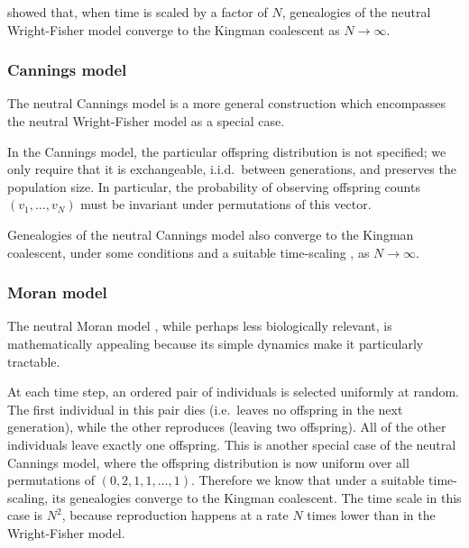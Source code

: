 \textcite{kingman1982gene} showed that, when time is scaled by a factor of $N$, genealogies of the neutral Wright-Fisher model converge to the Kingman coalescent as $N\to\infty$.

\subsubsection{Cannings model}
The neutral Cannings model \parencite{cannings1974, cannings1975} is a more general construction which encompasses the neutral Wright-Fisher model as a special case.

In the Cannings model, the particular offspring distribution is not specified; we only require that it is exchangeable, i.i.d.\ between generations, and preserves the population size. In particular, the probability of observing offspring counts $(v_1, \dots, v_N)$ must be invariant under permutations of this vector.

Genealogies of the neutral Cannings model also converge to the Kingman coalescent, under some conditions and a suitable time-scaling , as $N\to\infty$\seb{[citation]}.

\subsubsection{Moran model}
The neutral Moran model \parencite{moran1958}, while perhaps less biologically relevant, is mathematically appealing because its simple dynamics make it particularly tractable.

At each time step, an ordered pair of individuals is selected uniformly at random. The first individual in this pair dies (i.e.\ leaves no offspring in the next generation), while the other reproduces (leaving two offspring). All of the other individuals leave exactly one offspring.
This is another special case of the neutral Cannings model, where the offspring distribution is now uniform over all permutations of $(0,2,1,1,\dots,1)$.
Therefore we know that under a suitable time-scaling, its genealogies converge to the Kingman coalescent\seb{[citation]}. 
The time scale in this case is $N^2$, because reproduction happens at a rate $N$ times  lower than in the Wright-Fisher model. 


